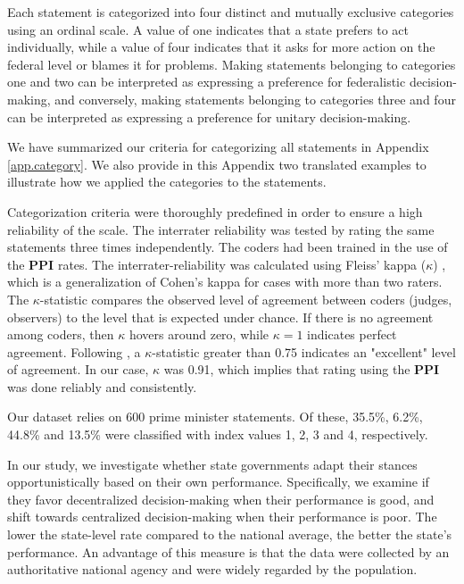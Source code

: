 \documentclass[12pt, abstract=true]{scrartcl}
\begin{document}
Each statement is categorized into four distinct and mutually exclusive categories using an ordinal scale. A value of one indicates that a state prefers to act individually, while a value of four indicates that it asks for more action on the federal level or blames it for problems. Making statements belonging to categories one and two can be interpreted as expressing a preference for federalistic decision-making, and conversely, making statements belonging to categories three and four can be interpreted as expressing a preference for unitary decision-making.

We have summarized our criteria for categorizing all statements in Appendix \ref{app.category}. We also provide in this Appendix two translated examples to illustrate how we applied the categories to the statements.

Categorization criteria were thoroughly predefined in order to ensure a high reliability of the scale. The interrater reliability was tested by rating the same statements three times independently. The coders had been trained in the use of the \textbf{PPI} rates. The interrater-reliability was calculated using Fleiss’ kappa ($\kappa$) \citep[][Ch.~18]{Fleiss2003}, which is a generalization of Cohen’s kappa for cases with more than two raters. The $\kappa$-statistic compares the observed level of agreement between coders (judges, observers) to the level that is expected under chance. If there is no agreement among coders, then ${\kappa}$ hovers around zero, while ${\kappa}=1$ indicates perfect agreement. Following \cite{Fleiss2003}, a $\kappa$-statistic greater than 0.75 indicates an "excellent" level of agreement. In our case, $\kappa$ was 0.91, which implies that rating using the \textbf{PPI} was done reliably and consistently.

Our dataset relies on 600 prime minister statements. Of these, 35.5\%, 6.2\%, 44.8\% and 13.5\% were classified with index values 1, 2, 3 and 4, respectively.

In our study, we investigate whether state governments adapt their stances opportunistically based on their own performance. Specifically, we examine if they favor decentralized decision-making when their performance is good, and shift towards centralized decision-making when their performance is poor. %
The lower the state-level rate compared to the national average, the better the state's performance. An advantage of this measure is that the data were collected by an authoritative national agency and were widely regarded by the population.
\end{document}
